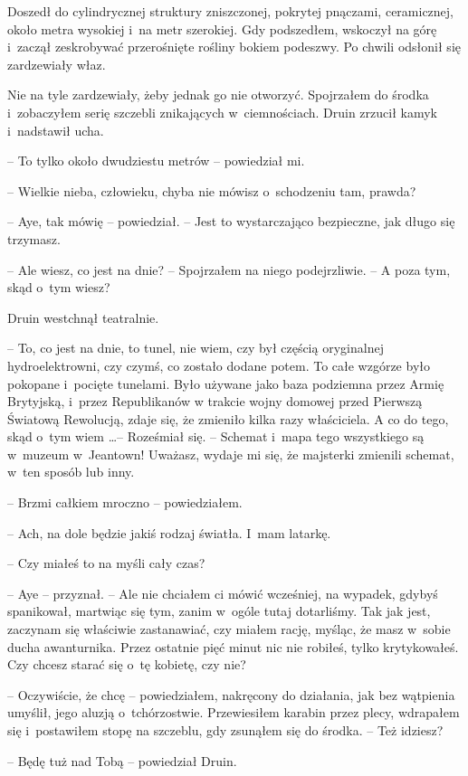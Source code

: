 \documentclass[oneside,polish,11pt,sfheadings]{mwbk}
\begin{document}
Doszedł do cylindrycznej struktury zniszczonej, pokrytej pnączami,
ceramicznej, około metra wysokiej i~na metr szerokiej. Gdy podszedłem,
wskoczył na górę i~zaczął zeskrobywać przerośnięte rośliny bokiem
podeszwy. Po chwili odsłonił się zardzewiały właz.

Nie na tyle zardzewiały, żeby jednak go nie otworzyć. Spojrzałem do
środka i~zobaczyłem serię szczebli znikających w~ciemnościach. Druin
zrzucił kamyk i~nadstawił ucha.

-- To tylko około dwudziestu metrów -- powiedział mi.

-- Wielkie nieba, człowieku, chyba nie mówisz o~schodzeniu tam, prawda?

-- Aye, tak mówię -- powiedział. -- Jest to wystarczająco bezpieczne, jak
długo się trzymasz.

-- Ale wiesz, co jest na dnie? -- Spojrzałem na niego podejrzliwie. -- A
poza tym, skąd o~tym wiesz?

Druin westchnął teatralnie. 

-- To, co jest na dnie, to tunel, nie wiem,
czy był częścią oryginalnej hydroelektrowni, czy czymś, co zostało
dodane potem. To całe wzgórze było pokopane i~pocięte tunelami. Było
używane jako baza podziemna przez Armię Brytyjską, i~przez Republikanów
w trakcie wojny domowej przed Pierwszą Światową Rewolucją, zdaje się, że
zmieniło kilka razy właściciela. A co do tego, skąd o~tym wiem \ldots -- Roześmiał się. -- Schemat i~mapa tego wszystkiego są w~muzeum w~Jeantown!
Uważasz, wydaje mi się, że majsterki zmienili schemat, w~ten sposób lub
inny.

-- Brzmi całkiem mroczno -- powiedziałem.

-- Ach, na dole będzie jakiś rodzaj światła. I~mam latarkę.

-- Czy miałeś to na myśli cały czas?

-- Aye -- przyznał. -- Ale nie chciałem ci mówić wcześniej, na wypadek,
gdybyś spanikował, martwiąc się tym, zanim w~ogóle tutaj dotarliśmy. Tak
jak jest, zaczynam się właściwie zastanawiać, czy miałem rację, myśląc,
że masz w~sobie ducha awanturnika. Przez ostatnie pięć minut nic nie
robiłeś, tylko krytykowałeś. Czy chcesz starać się o~tę kobietę, czy
nie?

-- Oczywiście, że chcę -- powiedziałem, nakręcony do działania, jak bez
wątpienia umyślił, jego aluzją o~tchórzostwie. Przewiesiłem karabin
przez plecy, wdrapałem się i~postawiłem stopę na szczeblu, gdy zsunąłem
się do środka. -- Też idziesz?

-- Będę tuż nad Tobą -- powiedział Druin.
\end{document}
